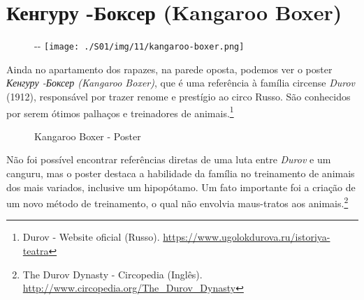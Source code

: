 \hypertarget{ux43aux435ux43dux433ux443ux440ux443--ux431ux43eux43aux441ux435ux440-kangaroo-boxer}{%
\section{Кенгуру -Боксер (Kangaroo
Boxer)}\label{ux43aux435ux43dux433ux443ux440ux443--ux431ux43eux43aux441ux435ux440-kangaroo-boxer}}

\begin{figure}[!ht]
  \begin{adjustwidth}{-\oddsidemargin-1in}{-\rightmargin}
    \centering
    \texttt{[image: ./S01/img/11/kangaroo-boxer.png]}
  \end{adjustwidth}
\end{figure}

\saveparinfos
\noindent
\begin{minipage}[c]{0.5\textwidth}\useparinfo

Ainda no apartamento dos rapazes, na parede oposta, podemos ver o poster
\emph{Кенгуру -Боксер (Kangaroo Boxer)}, que é uma referência à família
circense \emph{Durov} (1912), responsável por trazer renome e prestígio
ao circo Russo. São conhecidos por serem ótimos palhaços e treinadores
de animais.\footnote{\sloppy Durov - Website oficial (Russo). \url{https://www.ugolokdurova.ru/istoriya-teatra}}

\end{minipage}\hfill
\begin{minipage}[c]{0.5\textwidth}

\begin{figure}
  \centering
    \caption{Kangaroo Boxer - Poster\label{fig:kangaroo-boxer-poster}}
\end{figure}

\end{minipage}

Não foi possível encontrar referências diretas de uma luta entre
\emph{Durov} e um canguru, mas o poster destaca a habilidade da família
no treinamento de animais dos mais variados, inclusive um hipopótamo. Um
fato importante foi a criação de um novo método de treinamento, o qual
não envolvia maus-tratos aos animais.\footnote{\sloppy The Durov Dynasty - Circopedia (Inglês). \url{http://www.circopedia.org/The_Durov_Dynasty}}

